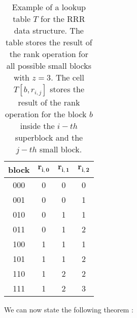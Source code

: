 \begin{table}[h]
    \centering
    \begin{tabular}{|c|c|c|c|}
        \hline
        \textbf{block} & $\mathbf{r_{i,0}}$ & $\mathbf{r_{i,1}}$ & $\mathbf{r_{i,2}}$ \\
        \hline
        000            & 0                  & 0                  & 0                  \\
        001            & 0                  & 0                  & 1                  \\
        010            & 0                  & 1                  & 1                  \\
        011            & 0                  & 1                  & 2                  \\
        100            & 1                  & 1                  & 1                  \\
        101            & 1                  & 1                  & 2                  \\
        110            & 1                  & 2                  & 2                  \\
        111            & 1                  & 2                  & 3                  \\
        \hline
    \end{tabular}
    \caption{Example of a lookup table $T$ for the RRR data structure. The table stores the result of the rank operation for all possible small blocks with $z = 3$. The cell $T[b, r_{i,j}]$ stores the result of the rank operation for the block $b$ inside the $i-th$ superblock and the $j-th$ small block.} \label{tab:lookup}
\end{table}

We can now state the following theorem \cite{ferragina2023pearls}:


